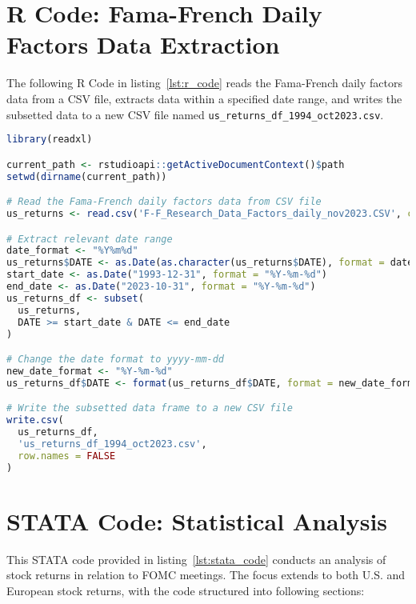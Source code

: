 


\section{R Code: Fama-French Daily Factors Data Extraction}
\label{app:r_code}

The following R Code in listing~\ref{lst:r_code} reads the Fama-French daily factors data from a CSV file, extracts data within a specified date range, and writes the subsetted data to a new CSV file named \texttt{us\_returns\_df\_1994\_oct2023.csv}.

\begin{singlespace}

\begin{lstlisting}[language=R, caption={R Code for Fama-French Daily Factors Data Extraction}, label=lst:r_code]
library(readxl)

current_path <- rstudioapi::getActiveDocumentContext()$path
setwd(dirname(current_path))

# Read the Fama-French daily factors data from CSV file
us_returns <- read.csv('F-F_Research_Data_Factors_daily_nov2023.CSV', col.names = c("DATE", "Mkt-RF", "SMB", "HML", "RF"), skip = 4)

# Extract relevant date range
date_format <- "%Y%m%d"
us_returns$DATE <- as.Date(as.character(us_returns$DATE), format = date_format)
start_date <- as.Date("1993-12-31", format = "%Y-%m-%d")
end_date <- as.Date("2023-10-31", format = "%Y-%m-%d")
us_returns_df <- subset(
  us_returns,
  DATE >= start_date & DATE <= end_date
)

# Change the date format to yyyy-mm-dd
new_date_format <- "%Y-%m-%d"
us_returns_df$DATE <- format(us_returns_df$DATE, format = new_date_format)

# Write the subsetted data frame to a new CSV file
write.csv(
  us_returns_df,
  'us_returns_df_1994_oct2023.csv',
  row.names = FALSE
)
\end{lstlisting}
\end{singlespace}


\section{STATA Code: Statistical Analysis }
\label{app:stata_code}

This STATA code provided in listing~\ref{lst:stata_code} conducts an analysis of stock returns in relation to FOMC meetings. The focus extends to both U.S. and European stock returns, with the code structured into following sections:

